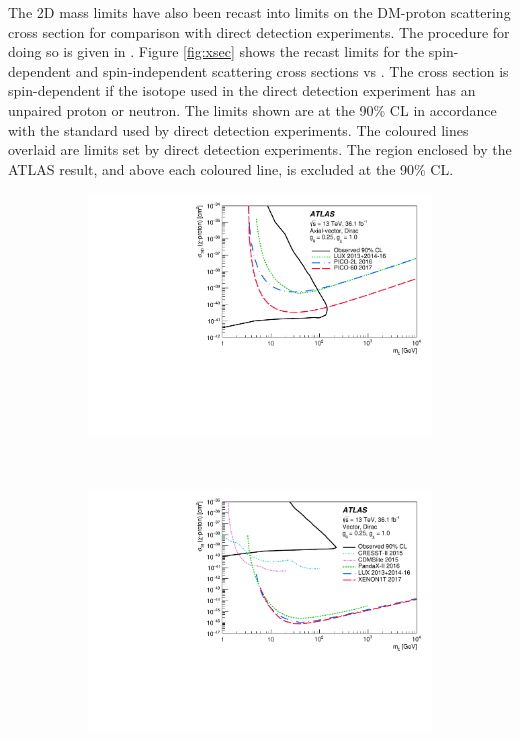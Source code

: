 The 2D mass limits have also been recast into limits on the DM-proton scattering cross section for comparison with direct detection experiments. The procedure for doing so is given in \cite{Boveia:2016mrp}. Figure \ref{fig:xsec} shows the recast \monoZ limits for the spin-dependent and spin-independent scattering cross sections vs \mmed. The cross section is spin-dependent if the isotope used in the direct detection experiment has an unpaired proton or neutron. The limits shown are at the 90\% CL in accordance with the standard used by direct detection experiments. The coloured lines overlaid are limits set by direct detection experiments. The region enclosed by the ATLAS result, and above each coloured line, is excluded at the 90\% CL.

\begin{figure}[!htb]
    \centering
    \begin{subfigure}[b]{0.48\textwidth}
        \includegraphics[width=\textwidth]{Figures/xsec_dmA.pdf}
        \label{fig:xsec_dmA}
    \end{subfigure}
    ~ %
    \begin{subfigure}[b]{0.48\textwidth}
        \includegraphics[width=\textwidth]{Figures/xsec_dmV.pdf}

\end{subfigure}
\end{figure}
